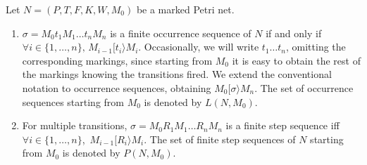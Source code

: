 \begin{definition} 
Let $N=(P,T,F,K,W,M_0)$ be a marked Petri net.
\begin{enumerate}
\item $\sigma = M_0 t_1 M_1 \ldots t_n M_n$ is a finite occurrence sequence of $N$
if and only if $\forall i \in \{1,\ldots,n\},\,M_{i-1} [ t_i \rangle M_i$.
Occasionally, we will write $t_1 \ldots t_n$, omitting the corresponding markings, since starting from
$M_0$ it is easy to obtain the rest of the markings knowing the transitions fired.
We extend the conventional notation to occurrence sequences, 
obtaining $M_0 [ \sigma \rangle M_n$.
The set of occurrence sequences starting from $M_0$ is denoted by $L(N,M_0)$.

\item For multiple transitions, $\sigma = M_0 R_1 M_1 \ldots R_n M_n$ is a finite step sequence
iff $\forall i \in \{1,\ldots,n\}$, $\,M_{i-1} [ R_i \rangle M_i$.
The set of finite step sequences of $N$ starting from $M_0$ is denoted by $P(N,M_0)$.
\end{enumerate}
\end{definition}



%
%
%

